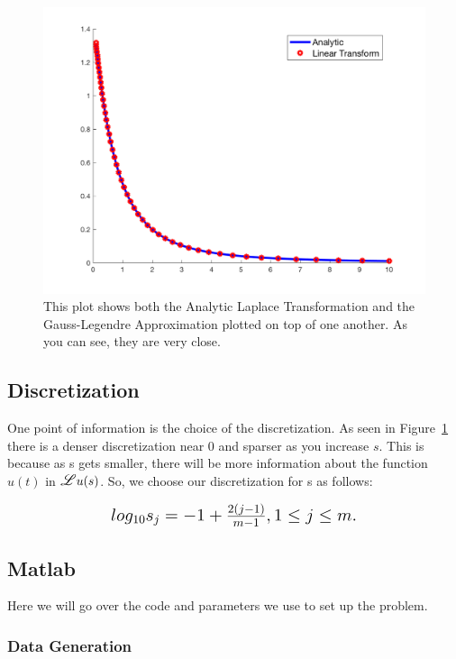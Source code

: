 \documentclass{article}
\newcommand\Laplace{\mathlarger{\mathlarger{\mathscr{L}}}}
\begin{document}
\begin{figure}[H]
    \centerline{
    \includegraphics[height = 10 cm]{Comparison.png}
    }
    \caption{\label{fig:Comparison} This plot shows both the Analytic Laplace Transformation and the Gauss-Legendre Approximation plotted on top of one another. As you can see, they are very close.}
\end{figure}

\subsection{Discretization}

One point of information is the choice of the discretization. As seen in Figure~\ref{fig:Comparison} there is a denser discretization near 0 and sparser as you increase $s$. This is because as s gets smaller, there will be more information about the function $u(t)$ in $\Laplace{u(s)}$. So, we choose our discretization for s as follows:

\begin{equation}
\mbox{\fontsize{14}{24}
\(
    log_{10}s_j = -1 + \frac{2(j - 1)}{m - 1},   1 \leq j \leq m.
\)
}
\end{equation}

\subsection{Matlab}

Here we will go over the code and parameters we use to set up the problem.

\subsubsection{Data Generation}
\end{document}
